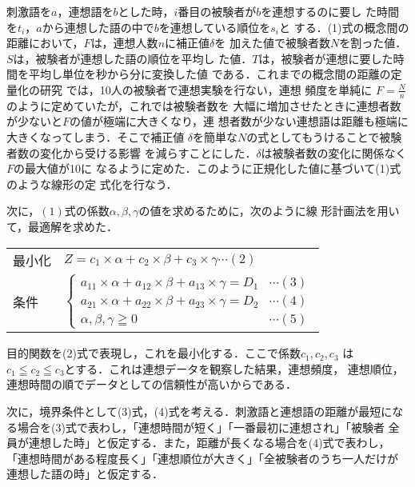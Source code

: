 刺激語を$a$，連想語を$b$とした時，$i$番目の被験者が$b$を連想するのに要し
た時間を$t_{i}$，$a$から連想した語の中で$b$を連想している順位を$s_{i}$と
する．(1)式の概念間の距離において，$F$は，連想人数$n$に補正値$\delta$を
加えた値で被験者数$N$を割った値．$S$は，被験者が連想した語の順位を平均し
た値．$T$は，被験者が連想に要した時間を平均し単位を秒から分に変換した値
である．これまでの概念間の距離の定量化の研究
\cite{Okamoto1998,Okamoto1999}では，10人の被験者で連想実験を行ない，連想
頻度を単純に $F = \frac{N}{n}$ のように定めていたが，これでは被験者数を
大幅に増加させたときに連想者数が少ないと${F}$の値が極端に大きくなり，連
想者数が少ない連想語は距離も極端に大きくなってしまう．そこで補正値
$\delta$を簡単な$N$の式としてもうけることで被験者数の変化から受ける影響
を減らすことにした．$\delta$は被験者数の変化に関係なく$F$の最大値が10に
なるように定めた．このように正規化した値に基づいて(1)式のような線形の定
式化を行なう．

次に，$(1)$式の係数$\alpha,\beta,\gamma$の値を求めるために，次のように線
形計画法を用いて，最適解を求めた．

\begin{center}
\begin{tabular}{|ll}
最小化
&
$Z = c_{1} \times \alpha + c_{2} \times \beta + c_{3} \times \gamma \cdots (2)$\\

条件 
&
$\left\{ \begin{array}{ll}
  a_{11} \times \alpha + a_{12} \times \beta + a_{13} \times \gamma=D_{1} & \cdots (3)\\
a_{21} \times \alpha + a_{22} \times \beta + a_{23} \times \gamma = D_{2} & \cdots (4)\\
\alpha, \beta, \gamma ≧ 0 & \cdots (5)
 \end{array}
\right .$
\end{tabular}
\end{center}
\vspace*{1em}

目的関数を(2)式で表現し，これを最小化する．ここで係数$c_{1},c_{2},c_{3}$
は$c_{1}≦c_{2}≦c_{3}$とする．これは連想データを観察した結果，連想頻度，
連想順位，連想時間の順でデータとしての信頼性が高いからである．

次に，境界条件として(3)式，(4)式を考える．刺激語と連想語の距離が最短にな
る場合を(3)式で表わし，「連想時間が短く」「一番最初に連想され」「被験者
全員が連想した時」と仮定する．また，距離が長くなる場合を(4)式で表わし，
「連想時間がある程度長く」「連想順位が大きく」「全被験者のうち一人だけが
連想した語の時」と仮定する．

